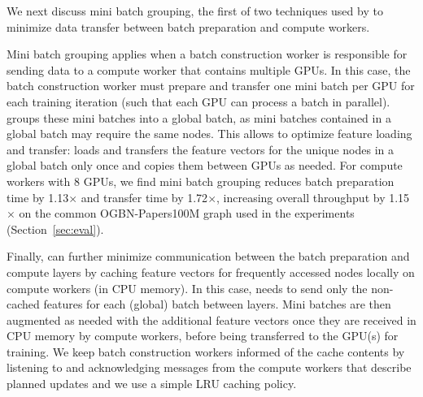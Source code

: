 We next discuss mini batch grouping, the first of two techniques used by \systemname to minimize data transfer between batch preparation and compute workers.

Mini batch grouping applies when a batch construction worker is responsible for sending data to a compute worker that contains multiple GPUs. In this case, the batch construction worker must prepare and transfer one mini batch per GPU for each training iteration (such that each GPU can process a batch in parallel). \systemname groups these mini batches into a global batch, as mini batches contained in a global batch may require the same nodes. This allows \systemname to optimize feature loading and transfer: \systemname loads and transfers the feature vectors for the unique nodes in a global batch only once and copies them between GPUs as needed.
For compute workers with 8 GPUs, we find mini batch grouping reduces batch preparation time by 1.13$\times$ and transfer time by 1.72$\times$, increasing overall throughput by 1.15$\times$ on the common OGBN-Papers100M graph used in the experiments (Section~\ref{sec:eval}).



Finally, \systemname can further minimize communication between the batch preparation and compute layers by caching feature vectors for frequently accessed nodes locally on compute workers (in CPU memory). In this case, \systemname needs to send only the non-cached features for each (global) batch between layers. Mini batches are then augmented as needed with the additional feature vectors once they are received in CPU memory by compute workers, before being transferred to the GPU(s) for training. We keep batch construction workers informed of the cache contents by listening to and acknowledging messages from the compute workers that describe planned updates and we use a simple LRU caching policy.
